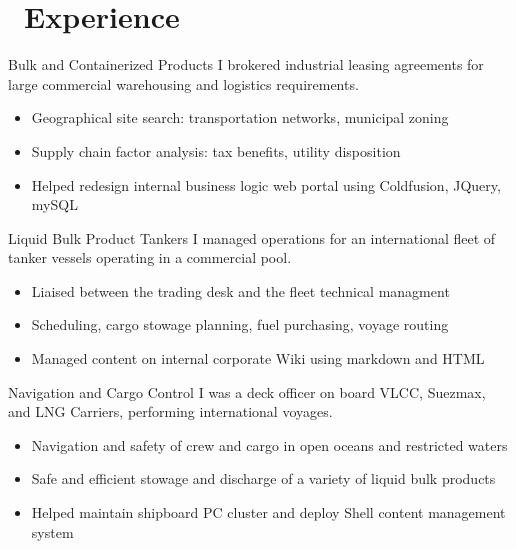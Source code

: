 \documentclass{resume}
\begin{document}
\section{\faBriefcase\ Experience}
 {Bulk and Containerized Products}
I brokered industrial leasing agreements for large commercial warehousing and logistics requirements.
\begin{itemize}
  \item Geographical site search: transportation networks, municipal zoning
  \item Supply chain factor analysis: tax benefits, utility disposition
  \item Helped redesign internal business logic web portal using Coldfusion, JQuery, mySQL
\end{itemize}

 {Liquid Bulk Product Tankers}
I managed operations for an international fleet of tanker vessels operating in a commercial pool.
\begin{itemize}
  \item Liaised between the trading desk and the fleet technical managment
  \item Scheduling, cargo stowage planning, fuel purchasing, voyage routing
  \item Managed content on internal corporate Wiki using markdown and HTML
\end{itemize}

 {Navigation and Cargo Control}
I was a deck officer on board VLCC, Suezmax, and LNG Carriers, performing international voyages.
\begin{itemize}
  \item Navigation and safety of crew and cargo in open oceans and restricted waters
  \item Safe and efficient stowage and discharge of a variety of liquid bulk products
  \item Helped maintain shipboard PC cluster and deploy Shell content management system
\end{itemize}

\end{document}
